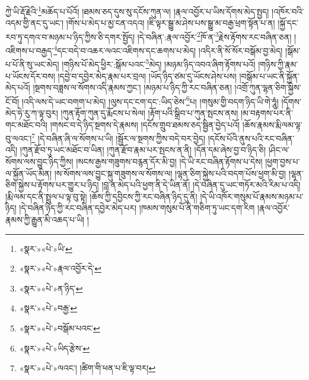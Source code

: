 ཀྱེ་ཡི་རྡོ་རྗེའི་\footnote{«སྣར་»«པེ་»ཡི་}མཆོད་པ་པོའོ། །ཐམས་ཅད་དུས་སུ་དངོས་ཀུན་ལ། །རྣལ་འབྱོར་པ་ཡིས་དོགས་མེད་སྤྱད། །འཁོར་བའི་འདམ་གྱི་ནང་དུ་ཡང་། །གོས་པ་མེད་པ་མྱ་ངན་འདའ། །ཇི་ལྟར་སྒྱུ་མ་ཤེས་པས་སྒྱུ་མ་བརྒྱ་ཕྲག་སྟོན་པ་ན། །སྐྱོ་དང་རབ་ཏུ་དགའ་བ་མཉམ་པ་ཉིད་ཀྱིས་ཅི་དགར་སྤྱོད། །དེ་བཞིན་:རྣལ་འབྱོར་\footnote{«སྣར་»«པེ་»རྣལ་འབྱོར་དེ་}ཁོ་ན་\footnote{«སྣར་»«པེ་»ན་ཉིད་}རྗེས་རྟོགས་རང་བཞིན་ཅན། །འཇིགས་པ་བརྒྱད་\footnote{«སྣར་»«པེ་»བརྒྱ་}དང་བདེ་བ་འཆར་ལའང་འཇིགས་དང་ཆགས་པ་མེད། །འདིར་ནི་སོ་སོར་བསྒོམ་བྱ་མེད། །སྒོམ་པ་པོ་ནི་སུ་ཡང་མེད། །གཉིས་པོ་མེད་ཕྱིར་:སྒོམ་པའང་\footnote{«སྣར་»«པེ་»བསྒོམ་པའང་}མེད། །མཉམ་ཉིད་འབའ་ཞིག་རྟོགས་པའོ། །གཉིས་ཀྱི་རྣམ་པ་ཡོངས་དོར་བས། །དབྱེ་བ་དབྱེར་མེད་རྣམ་པར་བྲལ། །ཡོད་ཉིད་ཙམ་དུ་ཡོངས་ཤེས་པས། །བསྒོམ་པ་ཡང་ནི་སྐྱོན་མེད་པའོ། །སྔགས་བཟླས་ལ་སོགས་འདི་རྣམས་ཀྱང་། །མཉམ་པ་ཉིད་ཀྱི་རང་བཞིན་ཅན། །འགྲོ་ཀུན་ལྷན་ཅིག་སྐྱེས་ངོ་བོ། །འདི་ལས་དེ་ཡང་བགག་པ་མེད། །ལུས་དང་ངག་དང་:ཡིད་ཅེས་\footnote{«སྣར་»«པེ་»ཡིད་རྩེས་}པ། །གསུམ་གྱི་བདག་ཉིད་ཡི་གེ་ཧཱུཾ། །དོགས་མེད་ཧེ་རུ་ཀ་ལྟ་བུར། །ཀུན་རྟོག་ཀུན་དུ་རྨོངས་པ་སེལ། །རྟོག་པའི་སྒྲིབ་པ་ཀུན་སྤངས་ནས། །མ་བརྟགས་པར་ནི་གང་མཐོང་བའི། །གསང་བ་དེ་ཉིད་སྔགས་དེ་རྣམས། །དངོས་གྲུབ་ཐམས་ཅད་སྦྱིན་བྱེད་པའོ། །ཆོས་རྣམས་རྨི་ལམ་ལྟ་བུ་ལའང་།\footnote{«སྣར་»«པེ་»ལའང་། །ཚིག་གི་ཕན་པ་ཇི་ལྟ་བར།} །དེ་བཞིན་ཞི་ལ་སོགས་པ་ཡི། །སྦྱོར་ལ་སྔགས་ཀྱིས་བདེ་བར་བྱེད། །དངོས་པོའི་ནུས་པའི་རང་བཞིན་འདི། །ཀུན་རྫོབ་ཏུ་ཡང་མཐོང་བ་ཡིན། །ཀུན་རྫོབ་རྣམ་པར་སྤངས་ན་ནི། །དོན་དམ་ཞེས་བྱ་བ་ཉིད་ཅི། །ཤིང་ལ་སོགས་ལས་བྱུང་ཉིད་ཀྱིས། །སངས་རྒྱས་གཟུགས་བརྙན་དོར་མི་བྱ། །དེ་ཡི་རང་བཞིན་རྟོགས་པ་དེས། །ཕྱག་བྱས་པ་ལ་སྐྱོན་ཡོད་མིན། །ས་སོགས་ལས་བྱུང་སྐུ་གཟུགས་ལ་སོགས་ལ། །ལྷན་ཅིག་སྐྱེས་པའི་བདག་པོས་ཕྱག་མི་བྱ། །ལྷན་ཅིག་སྐྱེས་པ་རྟོགས་པར་གྱུར་པ་ཉིད། །བླ་ན་མེད་པའི་ཕྱག་ནི་དེ་ཡིན་ནོ། །དེ་བཞིན་དུ་ཡང་གཏོར་མའི་རིམ་པ་འདི། །རྨི་ལམ་དང་ནི་སྤྲུལ་པ་ལྟ་བུ་སྟེ། །ཆོས་ཀྱི་དབྱིངས་ཀྱི་རང་བཞིན་ཉིད་དུ་ནི། །དེ་ཡི་འཁོར་གསུམ་པོ་རྣམས་མཉམ་པ་ཉིད། །དེ་བཞིན་ཉིད་ཀྱི་རང་བཞིན་དབྱེར་མེད་པར། །ཁམས་གསུམ་པོ་ནི་གཅིག་ཏུ་ཡང་དག་རིག །རྣལ་འབྱོར་རྣམས་ཀྱི་རྒྱུན་མི་འཆད་པ་ཡི། །
